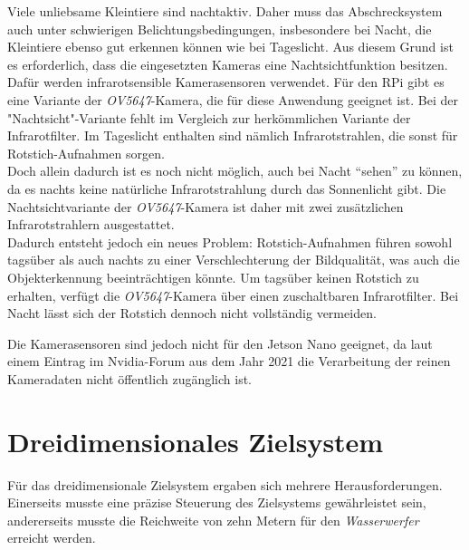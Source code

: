 Viele unliebsame Kleintiere sind nachtaktiv. Daher muss das Abschrecksystem auch unter schwierigen Belichtungsbedingungen, insbesondere bei Nacht, die Kleintiere ebenso gut erkennen können wie bei Tageslicht. Aus diesem Grund ist es erforderlich, dass die eingesetzten Kameras eine Nachtsichtfunktion besitzen. Dafür werden infrarotsensible Kamerasensoren verwendet. Für den \acl{RPi} gibt es eine Variante der \textit{OV5647}-Kamera, die für diese Anwendung geeignet ist. Bei der "Nachtsicht"-Variante fehlt im Vergleich zur herkömmlichen Variante der Infrarotfilter. Im Tageslicht enthalten sind nämlich Infrarotstrahlen, die sonst für Rotstich-Aufnahmen sorgen. 
\\
Doch allein dadurch ist es noch nicht möglich, auch bei Nacht \enquote{sehen} zu können, da es nachts keine natürliche Infrarotstrahlung durch das Sonnenlicht gibt. Die Nachtsichtvariante der \textit{OV5647}-Kamera ist daher mit zwei zusätzlichen Infrarotstrahlern ausgestattet.
\\
Dadurch entsteht jedoch ein neues Problem: Rotstich-Aufnahmen führen sowohl tagsüber als auch nachts zu einer Verschlechterung der Bildqualität, was auch die Objekterkennung beeinträchtigen könnte. Um tagsüber keinen Rotstich zu erhalten, verfügt die \textit{OV5647}-Kamera über einen zuschaltbaren Infrarotfilter. Bei Nacht lässt sich der Rotstich dennoch nicht vollständig vermeiden. \cite{ov_5647}

Die Kamerasensoren sind jedoch nicht für den Jetson Nano geeignet, da laut einem Eintrag im Nvidia-Forum aus dem Jahr 2021 die Verarbeitung der reinen Kameradaten nicht öffentlich zugänglich ist. \cite{nvidia_forum_2021_nvidia}
\\


\section{Dreidimensionales Zielsystem} \label{cap:dreidim}

Für das dreidimensionale Zielsystem ergaben sich mehrere Herausforderungen. Einerseits musste eine präzise Steuerung des Zielsystems gewährleistet sein, andererseits musste die Reichweite von zehn Metern für den \textit{Wasserwerfer} erreicht werden.

